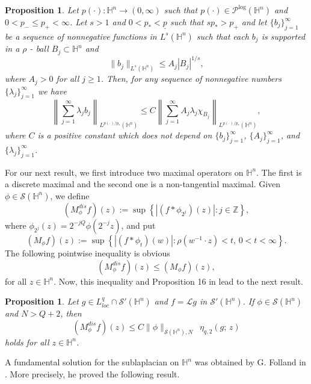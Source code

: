 \documentclass[oneside,10pt]{article}
\newtheorem{proposition}[theorem]{Proposition}
\begin{document}
\begin{proposition} \label{b_j functions}
Let $p(\cdot) : \mathbb{H}^{n} \to (0, \infty)$ such that $p(\cdot) \in \mathcal{P}^{\log}(\mathbb{H}^{n})$ and 
$0 < p_{-} \leq p_{+} < \infty$. Let $s > 1$ and $0 < p_{*} < \underline{p}$ such that $s p_{*} > p_{+}$ and let $\{ b_j \}_{j=1}^{\infty}$ be a sequence of nonnegative functions in $L^{s}(\mathbb{H}^{n})$ such that each $b_j$ is supported in a $\rho$ - ball 
$B_j \subset \mathbb{H}^{n}$ and
\begin{equation} \label{bks}
\| b_j \|_{L^{s}(\mathbb{H}^{n})} \leq A_j |B_j|^{1/s},
\end{equation}
where $A_j >0$ for all $j \geq 1$. Then, for any sequence of nonnegative numbers $\{ \lambda_j \}_{j=1}^{\infty}$ we have
\[
\left\| \sum_{j=1}^{\infty} \lambda_j b_j \right\|_{L^{p(\cdot)/p_{*}}(\mathbb{H}^{n})} \leq C \left\| \sum_{j=1}^{\infty} A_j \lambda_j 
\chi_{B_j} \right\|_{L^{p(\cdot)/p_{*}}(\mathbb{H}^{n})},
\]
where $C$ is a positive constant which does not depend on $\{ b_j \}_{j=1}^{\infty}$, $\{ A_j \}_{j=1}^{\infty}$, and 
$\{ \lambda_j \}_{j=1}^{\infty}$.
\end{proposition}
For our next result, we first introduce two maximal operators on $\mathbb{H}^n$. The first is a discrete maximal and the second one 
is a non-tangential maximal. Given $\phi \in \mathcal{S}(\mathbb{H}^n)$, we define
\[
(M_{\phi}^{dis} f)(z) := \sup \left\{ |(f \ast \phi_{2^j})(z)| : j \in \mathbb{Z} \right\},
\]
where $\phi_{2^j}(z) = 2^{-jQ} \phi (2^{-j}z)$, and put
\[
(M_{\phi} f)(z) := \sup \left\{ |(f \ast \phi_t)(w)| : \rho(w^{-1} \cdot z) < t, \, 0 < t < \infty \right\}.  
\]
The following pointwise inequality is obvious
\[
(M_{\phi}^{dis} f)(z) \leq (M_{\phi} f)(z),
\]
for all $z \in \mathbb{H}^n$. Now, this inequality and Proposition 16 in \cite{rocha5} lead to the next result. 

\begin{proposition} \label{Lg dist} Let $g \in L^q_{loc} \cap \mathcal{S}'(\mathbb{H}^n)$ and $f = \mathcal{L} g$ in 
$\mathcal{S}'(\mathbb{H}^n)$. If $\phi \in \mathcal{S}(\mathbb{H}^n)$ and $N > Q+2$, then
\[
(M_{\phi}^{dis}f)(z) \leq C \| \phi \|_{\mathcal{S}(\mathbb{H}^{n}), N}  \,\,\, \eta_{q, 2}(g; \, z)
\]
holds for all $z \in \mathbb{H}^n$.
\end{proposition}

A fundamental solution for the sublaplacian on $\mathbb{H}^n$ was obtained by G. Folland in \cite{Folland}. More precisely, he proved the following result.
\end{document}
